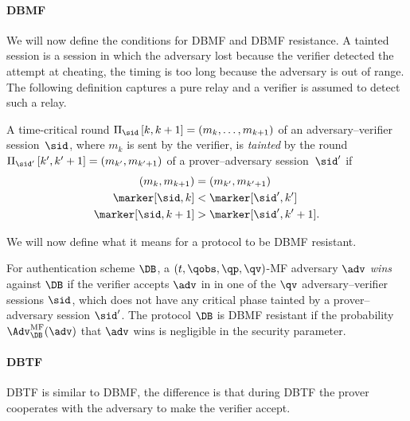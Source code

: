 \paragraph*{\Acl*{DBMF}}

We will now define the conditions for \ac{DBMF} and \ac{DBMF} resistance.
A tainted session is a session in which the adversary lost because the verifier 
detected the attempt at cheating, \eg the timing is too long because the 
adversary is out of range.
The following definition captures a pure relay and a verifier is assumed to 
detect such a relay.

\begin{definition}%
  \label{TaintedMF}
  A time-critical round
  \(\Xscript{\sid}{k, k+1} = (m_k, \dotsc, m_{k+1})\)
  of an adversary--verifier session~\(\sid\), where \(m_k\) is sent by the 
  verifier, is \emph{tainted} by the round
  \(\Xscript{\sid'}{k', k'+1} = (m_{k'}, m_{k'+1})\)
  of a prover--adversary session~\(\sid'\) if
  \begin{align*}
    (m_k, m_{k+1}) &= (m_{k'}, m_{k'+1}) \\
    \marker[\sid, k] &< \marker[\sid', k'] \\
    \marker[\sid, k+1] &> \marker[\sid', k'+1].
  \end{align*}
\end{definition}

We will now define what it means for a protocol to be \ac{DBMF} resistant.

\begin{definition}%
  \label{MFresistance}
  For  authentication scheme \(\DB\), a \((t, \qobs, \qp, \qv)\)-MF 
  adversary \(\adv\) \emph{wins} against \(\DB\) if the verifier accepts 
  \(\adv\) in in one of the \(\qv\) adversary--verifier sessions \(\sid\), 
  which does not have any critical phase tainted by a prover--adversary session 
  \(\sid'\).
  The protocol \(\DB\) is \Ac{DBMF} resistant if the probability 
  \(\Adv_{\DB}^{\text{MF}}(\adv)\) that \(\adv\) wins is negligible in the 
  security parameter.
\end{definition}

\paragraph*{\Acl*{DBTF}}

\Acl{DBTF} is similar to \ac{DBMF}, the difference is that during \ac{DBTF} the 
prover cooperates with the adversary to make the verifier accept.

